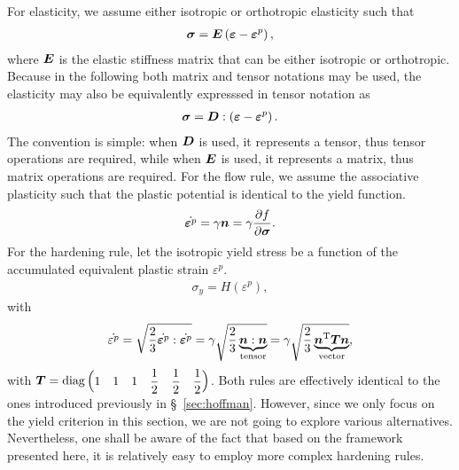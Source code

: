 For elasticity, we assume either isotropic or orthotropic elasticity such that
\begin{gather}
    \bm{\sigma}=\bm{E}\left(\bm{\varepsilon}-\bm{\varepsilon}^p\right),
\end{gather}
where $\bm{E}$ is the elastic stiffness matrix that can be either isotropic or orthotropic.
Because in the following both matrix and tensor notations may be used, the elasticity may also be equivalently expresssed in tensor notation as
\begin{gather}
    \bm{\sigma}=\bm{D}:\left(\bm{\varepsilon}-\bm{\varepsilon}^p\right).
\end{gather}
The convention is simple: when $\bm{D}$ is used, it represents a tensor, thus tensor operations are required, while when $\bm{E}$ is used, it represents a matrix, thus matrix operations are required.
For the flow rule, we assume the associative plasticity such that the plastic potential is identical to the yield function.
\begin{gather}
    \dot{\bm{\varepsilon}^p}=\gamma\bm{n}=\gamma\dfrac{\partial{f}}{\partial{\bm{\sigma}}}.
\end{gather}
For the hardening rule, let the isotropic yield stress be a function of the accumulated equivalent plastic strain $\varepsilon^p$.
\begin{gather}
    \sigma_y=H\left(\varepsilon^{p}\right),
\end{gather}
with
\begin{gather}
    \dot{\varepsilon^p}=\sqrt{\dfrac{2}{3}\dot{\bm{\varepsilon}^p}:\dot{\bm{\varepsilon}^p}}=\gamma\sqrt{\dfrac{2}{3}\underbrace{\bm{n}:\bm{n}}_\text{tensor}}=\gamma\sqrt{\dfrac{2}{3}\underbrace{\bm{n}^{\mathrm{T}}\bm{T}\bm{n}}_\text{vector}},
\end{gather}
with $\bm{T}=\text{diag}\left(\begin{matrix}
            1 & 1 & 1 & \dfrac{1}{2} & \dfrac{1}{2} & \dfrac{1}{2}
        \end{matrix}\right)$.
Both rules are effectively identical to the ones introduced previously in \S~\ref{sec:hoffman}.
However, since we only focus on the yield criterion in this section, we are not going to explore various alternatives.
Nevertheless, one shall be aware of the fact that based on the framework presented here, it is relatively easy to employ more complex hardening rules.
